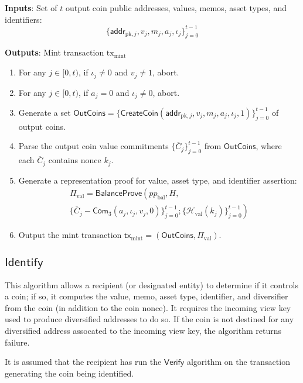 \documentclass{article}
\newcommand{\func}[1]{\mathsf{#1}}
\newcommand{\addr}{\func{addr}}
\newcommand{\com}{\func{Com}}
\newcommand{\hash}{\mathcal{H}}
\begin{document}
\textbf{Inputs}: Set of $t$ output coin public addresses, values, memos, asset types, and identifiers: $$\{\addr_{\text{pk},j}, v_j, m_j, a_j, \iota_j\}_{j=0}^{t-1}$$

\textbf{Outputs}: Mint transaction $\text{tx}_{\text{mint}}$

\begin{enumerate}
    \item For any $j \in [0, t)$, if $\iota_j \neq 0$ and $v_j \neq 1$, abort.
    \item For any $j \in [0, t)$, if $a_j = 0$ and $\iota_j \neq 0$, abort.
    \item Generate a set $\func{OutCoins} = \{\func{CreateCoin}(\addr_{\text{pk},j}, v_j, m_j, a_j, \iota_j, 1)\}_{j=0}^{t-1}$ of output coins.
    \item Parse the output coin value commitments $\{\overline{C}_j\}_{j=0}^{t-1}$ from $\func{OutCoins}$, where each $\overline{C}_j$ contains nonce $k_j$.
    \item Generate a representation proof for value, asset type, and identifier assertion:
    \begin{multline*}
        \Pi_{\text{val}} = \func{BalanceProve}\left( pp_{\text{bal}}, H, \right. \\
        \left. \{ \overline{C}_j - \com_3(a_j, \iota_j, v_j, 0) \}_{j=0}^{t-1}; \{\hash_{\text{val}}(k_j)\}_{j=0}^{t-1} \right)
    \end{multline*}
    \item Output the mint transaction $\func{tx}_{\text{mint}} = (\func{OutCoins}, \Pi_{\text{val}})$.
\end{enumerate}


\subsection{\texorpdfstring{$\func{Identify}$}{Identify}}

This algorithm allows a recipient (or designated entity) to determine if it controls a coin; if so, it computes the value, memo, asset type, identifier, and diversifier from the coin (in addition to the coin nonce).
It requires the incoming view key used to produce diversified addresses to do so.
If the coin is not destined for any diversified address assocated to the incoming view key, the algorithm returns failure.

It is assumed that the recipient has run the $\func{Verify}$ algorithm on the transaction generating the coin being identified.
\end{document}
